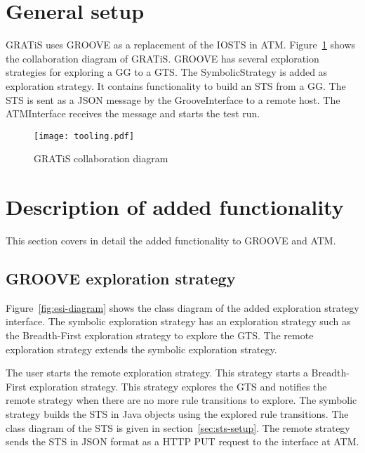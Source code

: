 \section{General setup}\label{sec:general-setup}
GRATiS uses GROOVE as a replacement of the IOSTS in ATM. Figure~\ref{fig:tooling} shows the collaboration diagram of GRATiS. GROOVE has several exploration strategies for exploring a GG to a GTS. The SymbolicStrategy is added as exploration strategy. It contains functionality to build an STS from a GG. The STS is sent as a JSON message by the GrooveInterface to a remote host. The ATMInterface receives the message and starts the test run.

\begin{figure}[ht]
  \begin{center}
    \texttt{[image: tooling.pdf]}
  \end{center}
  \caption{GRATiS collaboration diagram}
  \label{fig:tooling}
\end{figure}


\section{Description of added functionality}
This section covers in detail the added functionality to GROOVE and ATM. 

\subsection{GROOVE exploration strategy}
Figure~\ref{fig:esi-diagram} shows the class diagram of the added exploration strategy interface. The symbolic exploration strategy has an exploration strategy such as the Breadth-First exploration strategy to explore the GTS. The remote exploration strategy extends the symbolic exploration strategy.

The user starts the remote exploration strategy. This strategy starts a Breadth-First exploration strategy. This strategy explores the GTS and notifies the remote strategy when there are no more rule transitions to explore. The symbolic strategy builds the STS in Java objects using the explored rule transitions. The class diagram  of the STS is given in section~\ref{sec:sts-setup}. The remote strategy sends the STS in JSON format as a HTTP PUT request to the interface at ATM.

